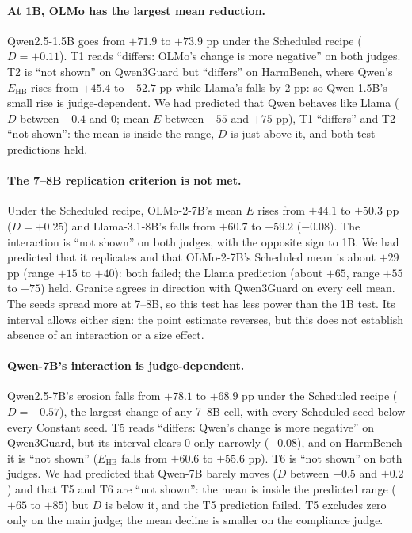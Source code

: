 \documentclass{article}
\newcommand{\Ehb}{E_{\mathrm{HB}}}
\begin{document}
\paragraph{At 1B, OLMo has the largest mean reduction.}
Qwen2.5-1.5B goes from $+71.9$ to $+73.9$ pp under the Scheduled recipe
($D = +0.11$). T1 reads ``differs: OLMo's change is more negative'' on both
judges. T2 is ``not shown'' on Qwen3Guard but ``differs'' on HarmBench, where
Qwen's $\Ehb$ rises from $+45.4$ to $+52.7$ pp while Llama's falls by 2 pp: so
Qwen-1.5B's small rise is judge-dependent. We had predicted that Qwen behaves
like Llama ($D$ between $-0.4$ and 0; mean $E$ between $+55$ and $+75$ pp), T1
``differs'' and T2 ``not shown'': the mean is inside the range, $D$ is just
above it, and both test predictions held.

\paragraph{The 7--8B replication criterion is not met.} Under the Scheduled
recipe, OLMo-2-7B's mean $E$ rises from $+44.1$ to $+50.3$ pp ($D = +0.25$)
and Llama-3.1-8B's falls from $+60.7$ to $+59.2$ ($-0.08$). The interaction is
``not shown'' on both judges, with the opposite sign to 1B. We had predicted
that it replicates and that OLMo-2-7B's Scheduled mean is about $+29$ pp
(range $+15$ to $+40$): both failed; the Llama prediction (about $+65$, range
$+55$ to $+75$) held. Granite agrees in direction with Qwen3Guard on every
cell mean. The seeds spread more at 7--8B, so this test has less power than
the 1B test. Its interval allows either sign: the point estimate reverses,
but this does not establish absence of an interaction or a size effect.

\paragraph{Qwen-7B's interaction is judge-dependent.}
Qwen2.5-7B's erosion falls from $+78.1$ to $+68.9$ pp under the Scheduled
recipe ($D = -0.57$), the largest change of any 7--8B cell, with every
Scheduled seed below every Constant seed. T5 reads ``differs: Qwen's change is
more negative'' on Qwen3Guard, but its interval clears 0 only narrowly
($+0.08$), and on HarmBench it is ``not shown'' ($\Ehb$ falls from $+60.6$ to
$+55.6$ pp). T6 is ``not shown'' on both judges. We had predicted that Qwen-7B
barely moves ($D$ between $-0.5$ and $+0.2$) and that T5 and T6 are ``not
shown'': the mean is inside the predicted range ($+65$ to $+85$) but $D$ is
below it, and the T5 prediction failed. T5 excludes zero only on the main
judge; the mean decline is smaller on the compliance judge.
\end{document}
